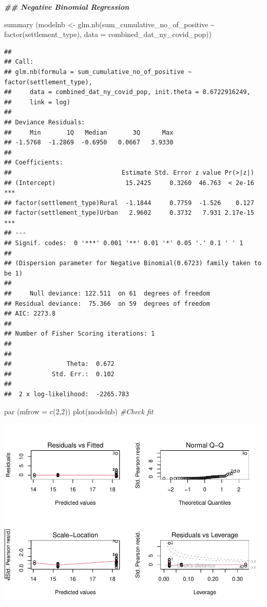 \documentclass[
  12pt,
]{article}
\newenvironment{Shaded}{\begin{snugshade}}{\end{snugshade}}
\newcommand{\AttributeTok}[1]{\textcolor[rgb]{0.77,0.63,0.00}{#1}}
\newcommand{\CommentTok}[1]{\textcolor[rgb]{0.56,0.35,0.01}{\textit{#1}}}
\newcommand{\DecValTok}[1]{\textcolor[rgb]{0.00,0.00,0.81}{#1}}
\newcommand{\DocumentationTok}[1]{\textcolor[rgb]{0.56,0.35,0.01}{\textbf{\textit{#1}}}}
\newcommand{\FunctionTok}[1]{\textcolor[rgb]{0.00,0.00,0.00}{#1}}
\newcommand{\NormalTok}[1]{#1}
\newcommand{\OtherTok}[1]{\textcolor[rgb]{0.56,0.35,0.01}{#1}}
\newcommand{\SpecialCharTok}[1]{\textcolor[rgb]{0.00,0.00,0.00}{#1}}
\begin{document}
\begin{Shaded}
\begin{Highlighting}[]
\DocumentationTok{\#\# Negative Binomial Regression}

\FunctionTok{summary}\NormalTok{ (modelnb }\OtherTok{\textless{}{-}} \FunctionTok{glm.nb}\NormalTok{(sum\_cumulative\_no\_of\_positive }\SpecialCharTok{\textasciitilde{}} \FunctionTok{factor}\NormalTok{(settlement\_type), }\AttributeTok{data =}\NormalTok{ combined\_dat\_ny\_covid\_pop))}
\end{Highlighting}
\end{Shaded}

\begin{verbatim}
## 
## Call:
## glm.nb(formula = sum_cumulative_no_of_positive ~ factor(settlement_type), 
##     data = combined_dat_ny_covid_pop, init.theta = 0.6722916249, 
##     link = log)
## 
## Deviance Residuals: 
##     Min       1Q   Median       3Q      Max  
## -1.5768  -1.2869  -0.6950   0.0667   3.9330  
## 
## Coefficients:
##                              Estimate Std. Error z value Pr(>|z|)    
## (Intercept)                   15.2425     0.3260  46.763  < 2e-16 ***
## factor(settlement_type)Rural  -1.1844     0.7759  -1.526    0.127    
## factor(settlement_type)Urban   2.9602     0.3732   7.931 2.17e-15 ***
## ---
## Signif. codes:  0 '***' 0.001 '**' 0.01 '*' 0.05 '.' 0.1 ' ' 1
## 
## (Dispersion parameter for Negative Binomial(0.6723) family taken to be 1)
## 
##     Null deviance: 122.511  on 61  degrees of freedom
## Residual deviance:  75.366  on 59  degrees of freedom
## AIC: 2273.8
## 
## Number of Fisher Scoring iterations: 1
## 
## 
##               Theta:  0.672 
##           Std. Err.:  0.102 
## 
##  2 x log-likelihood:  -2265.783
\end{verbatim}

\begin{Shaded}
\begin{Highlighting}[]
\FunctionTok{par}\NormalTok{ (}\AttributeTok{mfrow =} \FunctionTok{c}\NormalTok{(}\DecValTok{2}\NormalTok{,}\DecValTok{2}\NormalTok{))}
\FunctionTok{plot}\NormalTok{(modelnb) }\CommentTok{\#Check fit}
\end{Highlighting}
\end{Shaded}

\includegraphics{EDA_Final_Group_Project_files/figure-latex/unnamed-chunk-20-1.pdf}
\end{document}
